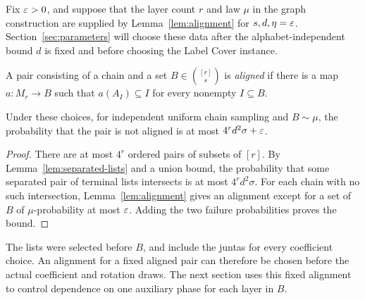 Fix $\varepsilon>0$, and suppose that the layer count $r$ and law $\mu$ in
the graph construction are supplied by Lemma~\ref{lem:alignment}
for $s,d,\eta=\varepsilon$. Section~\ref{sec:parameters} will choose these
data after the alphabet-independent bound $d$ is fixed and before
choosing the Label Cover instance.

\begin{definition}
A pair consisting of a chain and a set $B\in\binom{[r]}s$ is
\emph{aligned} if there is a map $a:M_r\to B$ such that
$a(A_I)\subseteq I$ for every nonempty $I\subseteq B$.
\end{definition}

\begin{lemma}
\label{lem:good-pairs}
Under these choices, for independent uniform chain sampling and
$B\sim\mu$, the probability that the pair is not aligned is at most
$4^r d^2\sigma+\varepsilon$.
\end{lemma}

\begin{proof}
There are at most $4^r$ ordered pairs of subsets of $[r]$.
By Lemma~\ref{lem:separated-lists} and a union bound, the probability
that some separated pair of terminal lists intersects is at most
$4^r d^2\sigma$.
For each chain with no such intersection, Lemma~\ref{lem:alignment}
gives an alignment except for a set of $B$ of $\mu$-probability
at most $\varepsilon$. Adding the two failure probabilities proves the bound.
\end{proof}

The lists were selected before $B$, and include the juntas for every
coefficient choice. An alignment for a fixed aligned pair can therefore
be chosen before the actual coefficient and rotation draws.
The next section uses this fixed alignment to control dependence on
one auxiliary phase for each layer in $B$.
